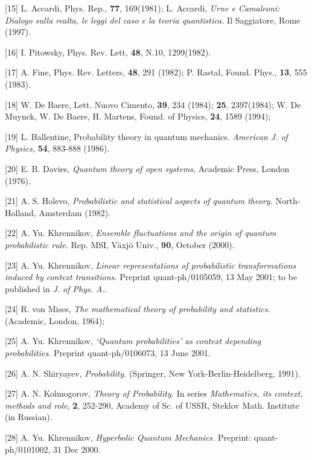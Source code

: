 \documentclass[12pt,oneside,final,a4paper]{article}
\begin{document}
[15] L. Accardi, Phys. Rep., {\bf 77}, 169(1981); 
L. Accardi, {\it Urne e Camaleoni: Dialogo sulla realta,
le leggi del caso e la teoria quantistica.} Il Saggiatore, Rome (1997).

[16] I. Pitowsky,  Phys. Rev. Lett, {\bf 48}, N.10, 1299(1982).
 
[17]  A. Fine,  Phys. Rev. Letters, {\bf 48}, 291 (1982);
P. Rastal, Found. Phys., {\bf 13}, 555 (1983).

[18] W. De Baere,  Lett. Nuovo Cimento, {\bf 39}, 234 (1984);
{\bf 25}, 2397(1984); 
 W. De Muynck, W. De Baere, H. Martens,
 Found. of Physics, {\bf 24}, 1589 (1994);

[19] L. Ballentine, Probability theory in quantum mechanics. {\it American
J. of Physics,} {\bf 54}, 883-888 (1986).

[20] E. B. Davies, {\it Quantum theory of open systems}, Academic Press, 
London (1976).

[21] A. S. Holevo, {\it Probabilistic and 
statistical aspects of quantum 
theory.} North-Holland, Amsterdam (1982).

[22] A. Yu. Khrennikov, {\it Ensemble fluctuations and the origin of
quantum probabilistic rule.} Rep. MSI, V\"axj\"o Univ., {\bf 90}, October (2000).


[23] A. Yu. Khrennikov, {\it Linear representations of probabilistic
transformations induced
by context transitions.} Preprint quant-ph/0105059, 13 May 2001;
to be published in {\it J. of Phys. A.}.

[24] R.  von Mises, {\it The mathematical theory of probability and
 statistics}. (Academic, London,  1964);

[25] A. Yu. Khrennikov, {\it `Quantum probabilities'  as context depending
probabilities.}
Preprint quant-ph/0106073, 13 June 2001.

[26] A. N. Shiryayev, {\it Probability.} (Springer, New York-Berlin-Heidelberg, 1991). 

 
[27]   A. N. Kolmogorov, {\it Theory of Probability.} In series {\it Mathematics, its context, methods and role},
{\bf 2}, 252-290, Academy of Sc. of USSR, Steklov Math. Institute (in Russian).
 
[28] A. Yu. Khrennikov, {\it Hyperbolic Quantum Mechanics.} Preprint: quant-ph/0101002, 31 Dec 2000.
\end{document}
